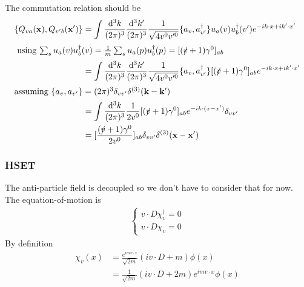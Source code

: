 \documentclass{article}
\newcommand{\g}{\gamma}
\begin{document}
The commutation relation should be
\begin{align*}
  \{Q_{va}(\vb{x}),Q_{v'b}(\vb{x'})\}&=\int \frac{\dd^3k}{(2\pi)^3}\frac{\dd^3k'}{(2\pi)^3}\frac{1}{\sqrt{4v^0v'^0}}\{a_v,a_{v'}^{\dagger}\}u_a(v)u_b^{\dagger}(v')e^{-ik\cdot x+ik'\cdot x'}\\
  \intertext{
  using $\sum_s u_a(v)u_b^{\dagger}(v)=\frac{1}{m}\sum_s u_a(p)u^{\dagger}_b(p)=[(\slashed v+1)\g^0]_{ab}$}
  &=\int \frac{\dd^3k}{(2\pi)^3}\frac{\dd^3k'}{(2\pi)^3}\frac{1}{\sqrt{4v^0v'^0}}\{a_v,a_{v'}^{\dagger}\}[(\slashed v+1)\g^0]_{ab}e^{-ik\cdot x+ik'\cdot x'}\\
  \intertext{assuming $\{a_v,a_{v'}\}=(2\pi)^3\delta_{vv'}\delta^{(3)}(\vb{k-k'})$}
  &=\int \frac{\dd^3k}{(2\pi)^3}\frac{1}{2v^0}[(\slashed v+1)\g^0]_{ab}e^{-ik\cdot (x-x')}\delta_{vv'}\\
  &=[\frac{(\slashed v+1)\g^0}{2v^0}]_{ab}\delta_{vv'}\delta^{(3)}(\vb{x-x'})
\end{align*}
\subsubsection{HSET}
The anti-particle field is decoupled so we don't have to consider that for now. The equation-of-motion is
\begin{align*}
  \begin{cases}
	v\cdot D\chi_v^{\dagger}=0\\
	v\cdot D\chi_v=0
  \end{cases}
\end{align*}
By definition
\begin{align*}
  \chi_v(x)&=\frac{e^{imv\cdot x}}{\sqrt{2m}}(iv\cdot D+m)\phi(x)\\
  &=\frac{1}{\sqrt{2m}}(iv\cdot D+2m)e^{imv\cdot x}\phi(x)
\end{align*}
\end{document}

